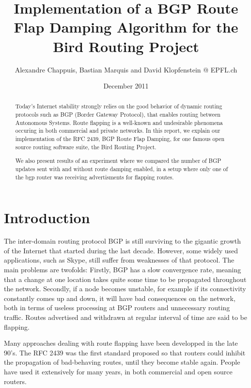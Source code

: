 \documentclass[a4paper,english]{IEEEtran}
\begin{document}
\date{December 2011}

\author{Alexandre Chappuis, Bastian Marquis and David Klopfenstein @ EPFL.ch}

\title{Implementation of a BGP Route Flap Damping Algorithm for the Bird
Routing Project}
\maketitle
\begin{abstract}

Today's Internet stability strongly relies on the good behavior of
dynamic routing protocols such as BGP (Border Gateway Protocol),
that enables routing between Autonomous Systems. Route flapping is
a well-known and undesirable phenomena occuring in both commercial
and private networks. In this report, we explain our implementation
of the RFC 2439, BGP Route Flap Damping, for one famous open source
routing software suite, the Bird Routing Project.

\par

We also present results of an experiment where we compared the number of
BGP updates sent with and without route damping enabled, in a setup where only one of the bgp router was receiving advertisments for flapping routes.

\end{abstract}

\section{Introduction}

The inter-domain routing protocol BGP is still surviving to the gigantic
growth of the Internet that started during the last decade.
However, some widely used applications, such as Skype, still suffer from weaknesses
of that protocol.
The main problems are twofolds:
Firstly, BGP has a slow convergence rate, meaning that a change
at one location takes quite some time to be propagated throughout
the network. Secondly, if a node becomes unstable, for example if
its connectivity constantly comes up and down, it will have bad consequences
on the network, both in terms of useless processing at BGP routers and
unnecessary routing traffic. Routes advertised and withdrawn
at regular interval of time are said to be flapping.

Many approaches dealing with route flapping have been developped in the late 90's.
The RFC 2439\cite{rfc2439} was the first standard
proposed so that routers could inhibit the propagation of bad-behaving
routes, until they become stable again. People have used it extensively
for many years, in both commercial and open source routers.
\end{document}
